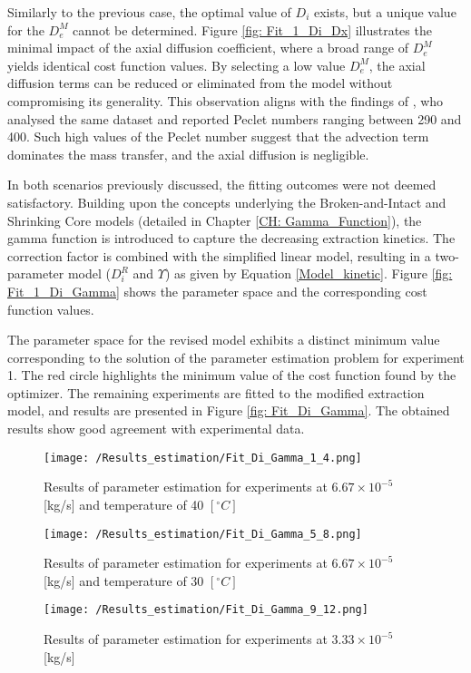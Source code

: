 \documentclass[../Supercritical_fluid_extraction_of_essential_oil_from_chamomile.tex]{subfiles}
\begin{document}
	Similarly to the previous case, the optimal value of $D_i$ exists, but a unique value for the $D_e^M$ cannot be determined. Figure \ref{fig: Fit_1_Di_Dx} illustrates the minimal impact of the axial diffusion coefficient, where a broad range of $D_e^M$ yields identical cost function values. By selecting a low value $D_e^M$, the axial diffusion terms can be reduced or eliminated from the model without compromising its generality. This observation aligns with the findings of \citet{Rahimi2011}, who analysed the same dataset and reported Peclet numbers ranging between 290 and 400. Such high values of the Peclet number suggest that the advection term dominates the mass transfer, and the axial diffusion is negligible.
	
	In both scenarios previously discussed, the fitting outcomes were not deemed satisfactory. Building upon the concepts underlying the Broken-and-Intact and Shrinking Core models (detailed in Chapter \ref{CH: Gamma_Function}), the gamma function is introduced to capture the decreasing extraction kinetics. The correction factor is combined with the simplified linear model, resulting in a two-parameter model ($D_i^R$ and $\Upsilon$) as given by Equation \ref{Model_kinetic}. Figure \ref{fig: Fit_1_Di_Gamma} shows the parameter space and the corresponding cost function values.

	The parameter space for the revised model exhibits a distinct minimum value corresponding to the solution of the parameter estimation problem for experiment 1. The red circle highlights the minimum value of the cost function found by the optimizer. The remaining experiments are fitted to the modified extraction model, and results are presented in Figure \ref{fig: Fit_Di_Gamma}. The obtained results show good agreement with experimental data. 

	\begin{figure*}[!h]
		\centering
		\begin{subfigure}{0.3\textwidth}
			\centering
			\texttt{[image: /Results\_estimation/Fit\_Di\_Gamma\_1\_4.png]}
			\caption{Results of parameter estimation for experiments at $6.67\times 10^{-5}$ [kg/s] and temperature of 40 $[^\circ C]$}
			\label{fig: Fit_1_4_Di_Gamma}
		\end{subfigure}
		\hfill
		\begin{subfigure}{0.3\textwidth}
			\centering
			\texttt{[image: /Results\_estimation/Fit\_Di\_Gamma\_5\_8.png]}
			\caption{Results of parameter estimation for experiments at $6.67\times 10^{-5}$ [kg/s] and temperature of 30 $[^\circ C]$}
			\label{fig: Fit_5_8_Di_Gamma}
		\end{subfigure}
		\hfill
		\begin{subfigure}{0.3\textwidth}
			\centering
			\texttt{[image: /Results\_estimation/Fit\_Di\_Gamma\_9\_12.png]}
			\caption{Results of parameter estimation for experiments at $3.33\times 10^{-5}$ [kg/s]}
			\label{fig: Fit_9_12_Di_Gamma}
		\end{subfigure}
		\caption{Parameter estimation results}
		\label{fig: Fit_Di_Gamma}
	\end{figure*}
	
\end{document}
